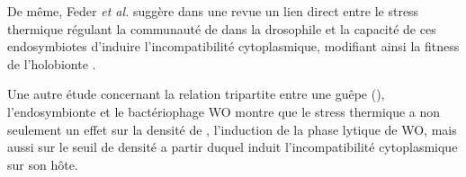 De même, Feder \textit{et al.} suggère dans une revue un lien direct entre le stress thermique régulant la communauté de  dans la drosophile et la capacité de ces endosymbiotes d'induire l'incompatibilité cytoplasmique, modifiant ainsi la fitness de l'holobionte \cite{feder1999}. 

Une autre étude \cite{bordenstein2011} concernant la relation tripartite entre une guêpe (), l'endosymbionte  et le bactériophage WO montre que le stress thermique a non seulement un effet sur la densité de , l'induction de la phase lytique de WO, mais aussi sur le seuil de densité a partir duquel  induit l'incompatibilité cytoplasmique sur son hôte.
